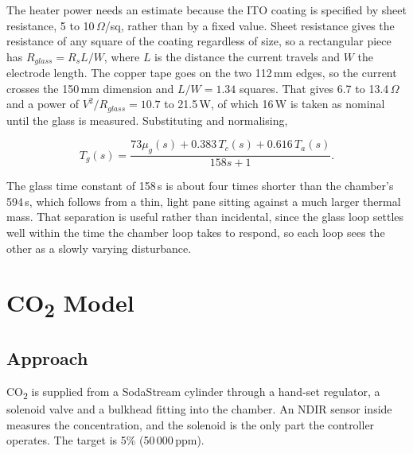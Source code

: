 The heater power needs an estimate because the ITO coating is specified by sheet resistance, 5 to 10\,$\Omega$/sq, rather than by a fixed value. Sheet resistance gives the resistance of any square of the coating regardless of size, so a rectangular piece has $R_{glass} = R_s L/W$, where $L$ is the distance the current travels and $W$ the electrode length. The copper tape goes on the two 112\,mm edges, so the current crosses the 150\,mm dimension and $L/W = 1.34$ squares. That gives 6.7 to 13.4\,$\Omega$ and a power of $V^2/R_{glass} = 10.7$ to 21.5\,W, of which 16\,W is taken as nominal until the glass is measured. Substituting and normalising,

\begin{equation}
T_g(s) = \frac{73 \mu_g(s) + 0.383\,T_c(s) + 0.616\,T_a(s)}{158s + 1}.
\label{eq:glass-tf-final}
\end{equation}

The glass time constant of 158\,s is about four times shorter than the chamber's 594\,s, which follows from a thin, light pane sitting against a much larger thermal mass. That separation is useful rather than incidental, since the glass loop settles well within the time the chamber loop takes to respond, so each loop sees the other as a slowly varying disturbance.

\section{CO\textsubscript{2} Model}
\label{sec:co2-model}

\subsection{Approach}
\label{subsec:co2-approach}

CO\textsubscript{2} is supplied from a SodaStream cylinder through a hand-set regulator, a solenoid valve and a bulkhead fitting into the chamber. An NDIR sensor inside measures the concentration, and the solenoid is the only part the controller operates. The target is 5\% (50\,000\,ppm).

